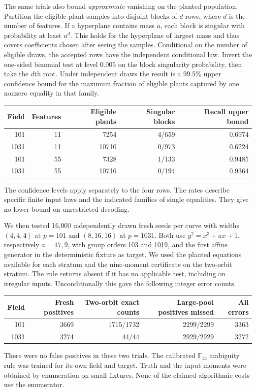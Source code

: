 \documentclass[11pt]{article}
\newcommand{\F}{\mathbb F}
\begin{document}
The same trials also bound \emph{approximate} vanishing on the planted
population. Partition the eligible plant samples into disjoint blocks of
$d$ rows, where $d$ is the number of features. If a hyperplane contains
mass $a$, each block is singular with probability at least $a^d$. This
holds for the hyperplane of largest mass and thus covers coefficients
chosen after seeing the samples. Conditional on the number of eligible
draws, the accepted rows have the independent conditional law. Invert
the one-sided binomial test at level $0.005$ on the block singularity
probability, then take the $d$th root. Under independent draws the
result is a 99.5\% upper confidence bound for the maximum fraction of
eligible plants captured by one nonzero equality in that family.
\begin{center}
\begin{tabular}{rrrrr}
\toprule Field & Features & Eligible plants & Singular blocks & Recall upper bound\\
\midrule
101 & 11 & 7254 & 4/659 & 0.6974\\
1031 & 11 & 10710 & 0/973 & 0.6224\\
101 & 55 & 7328 & 1/133 & 0.9485\\
1031 & 55 & 10716 & 0/194 & 0.9364\\
\bottomrule
\end{tabular}
\end{center}
The confidence levels apply separately to the four rows. The rates
describe specific finite input laws and the indicated families of
single equalities. They give no lower bound on unrestricted decoding.

We then tested 16,000 independently drawn fresh seeds per curve with
widths $(4,4,4)$ at $p=101$ and $(8,16,16)$ at $p=1031$. Both use
$y^2=x^3+ax+1$, respectively $a=17,9$, with group orders 103 and 1019,
and the first affine generator in the deterministic fixture as target.
We used the planted equations available for each stratum and the
nine-moment certificate on the two-orbit stratum. The rule returns
absent if it has no applicable test, including on irregular inputs.
Unconditionally this gave the following integer error counts.
\begin{center}
\begin{tabular}{rrrrr}
\toprule Field & Fresh positives & Two-orbit exact counts & Large-pool positives missed & All errors\\
\midrule
101 & 3669 & 1715/1732 & 2299/2299 & 3363\\
1031 & 3274 & 44/44 & 2929/2929 & 3272\\
\bottomrule
\end{tabular}
\end{center}
There were no false positives in these two trials. The calibrated
$\F_{13}$ ambiguity rule was trained for its own field and target.
Truth and the input moments were obtained by enumeration on small
fixtures. None of the claimed algorithmic costs use the enumerator.
\end{document}
